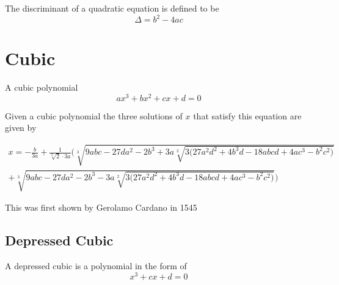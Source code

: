 \documentclass[a4paper]{article}
\begin{document}
The discriminant of a quadratic equation is defined to be 
\begin{equation}
\Delta = b^2 - 4ac\label{eq:equation2}
\end{equation}

\section{Cubic}\label{sec:cubic}

\begin{definition}\label{cubic def}
A cubic polynomial
\[
ax^3 + bx^2 + cx + d = 0
\]
\end{definition}

Given a cubic polynomial the three solutions of $x$ that satisfy this equation are given by 

\begin{equation} \label{eq:cubic-solution}
\boxed{
\begin{split}
x = - \frac{b}{3a} +
\frac{1}{\sqrt[3]{2} \cdot 3 a} \Bigg(
 \sqrt[3]{9abc - 27 d a^2 - 2 b^3  + 3a \sqrt[2]{
3 \Big( 
27 a^2 d^2 + 4 b^3 d - 18 abcd + 4 a c^3 - b^2 c^2
\Big)
}} 
\\
+
\sqrt[3]{9abc - 27 d a^2 - 2 b^3 - 
3a \sqrt[2]{
3
\Big( 
27 a^2 d^2 + 4 b^3 d - 18 abcd + 4 a c^3 - b^2 c^2
\Big)
}}
\Bigg)
\end{split}
}
\end{equation}

This was first shown by Gerolamo Cardano in 1545

\subsection{Depressed Cubic}\label{subsec:depressed-cubic}
\begin{definition}\label{depressed cubic def}
A depressed cubic is a polynomial in the form of
\[
x^3 + cx + d = 0
\]
\end{definition}
\end{document}
